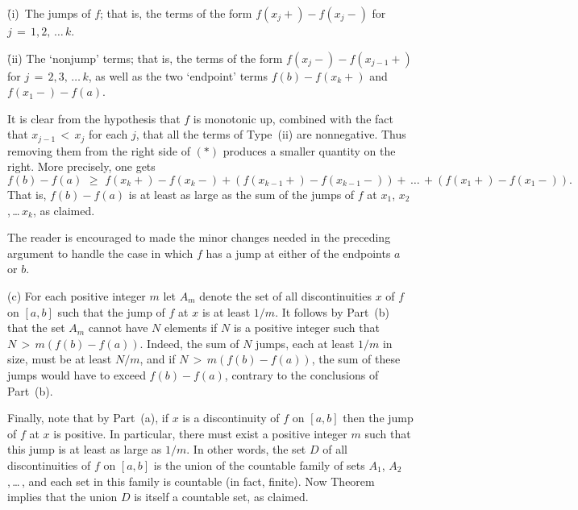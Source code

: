 \V

        \h (i)\, The jumps of $f$; that is, the terms of the form $f(x_{j}+)-f(x_{j}-)$ for $j \,=\, 1,2,\,{\ldots}\,k$.

        \h (ii) The `nonjump' terms; that is, the terms of the form $f(x_{j}-)-f(x_{j-1}+)$ for $j \,=\, 2,3,\,{\ldots}\,k$,
    as well as the two `endpoint' terms $f(b)-f(x_{k}+)$ and $f(x_{1}-)-f(a)$.

\V

\noindent It is clear from the hypothesis that $f$ is monotonic up, combined with the fact that $x_{j-1}\,<\,x_{j}$ for each $j$,
    that all the terms of Type~(ii) are nonnegative.
    Thus removing them from the right side of $({\ast})$ produces a smaller quantity on the right. More precisely, one gets
        \begin{displaymath}
        f(b)-f(a)\,\,{\geq}\,\,f(x_{k}+)-f(x_{k}-) + (f(x_{k-1}+)-f(x_{k-1}-)) + \,{\ldots}\,+ (f(x_{1}+)-f(x_{1}-)).
        \end{displaymath}
    That is, $f(b)-f(a)$ is at least as large as the sum of the jumps of $f$ at $x_{1}$, $x_{2}$,\,{\ldots}\,$x_{k}$, as claimed.

        The reader is encouraged to made the minor changes needed in the preceding argument to handle the case in which $f$ has a jump at either of the endpoints $a$ or $b$.

\V

        (c) For each positive integer $m$ let $A_{m}$ denote the set of all discontinuities $x$ of $f$ on $[a,b]$ such that the jump of $f$ at $x$ is at least $1/m$.
    It follows by Part~(b) that the set $A_{m}$ cannot have $N$ elements if $N$ is a positive integer such that $N\,>\,m(f(b)-f(a))$.
    Indeed, the sum of $N$ jumps, each at least $1/m$ in size, must be at least $N/m$, and if $N\,>\,m(f(b)-f(a))$, the sum of these jumps would have to exceed $f(b)-f(a)$, contrary to the conclusions of Part~(b).

    Finally, note that by Part~(a), if $x$ is a discontinuity of $f$ on $[a,b]$ then the jump of $f$ at $x$ is positive. In particular, there must exist a positive integer $m$ such that this jump is at least as large as $1/m$.
    In other words, the set $D$ of all discontinuities of $f$ on $[a,b]$ is the union of the countable family of sets $A_{1}$, $A_{2}$,\,{\ldots}\,, and each set in this family is countable (in fact, finite).
    Now Theorem~ implies that the union $D$ is itself a countable set, as claimed.

